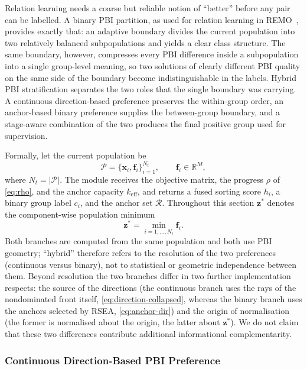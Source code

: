 \documentclass[11pt,a4paper]{article}
\newcommand{\vf}{\mathbf{f}}
\newcommand{\vx}{\mathbf{x}}
\newcommand{\vz}{\mathbf{z}}
\newcommand{\keff}{k_{\mathrm{eff}}}
\begin{document}
Relation learning needs a coarse but reliable notion of ``better'' before any
pair can be labelled. A binary PBI partition, as used for relation learning in
REMO~\cite{ref:remo}, provides exactly that: an adaptive boundary divides the
current population into two relatively balanced subpopulations and yields a
clear class structure. The same boundary, however, compresses every PBI
difference inside a subpopulation into a single group-level meaning, so two
solutions of clearly different PBI quality on the same side of the boundary
become indistinguishable in the labels. Hybrid PBI stratification separates the
two roles that the single boundary was carrying. A continuous
direction-based preference preserves the within-group order, an anchor-based
binary preference supplies the between-group boundary, and a stage-aware
combination of the two produces the final positive group used for supervision.

Formally, let the current population be
\begin{equation}
\mathcal{P}=\{\vx_i,\vf_i\}_{i=1}^{N_t},
\qquad
\vf_i\in\mathbb{R}^{M},
\label{eq:pop}
\end{equation}
where $N_t=|\mathcal{P}|$. The module receives the objective matrix, the
progress $\rho$ of \eqref{eq:rho}, and the anchor capacity $\keff$, and returns
a fused sorting score $h_i$, a binary group label $c_i$, and the anchor set
$\mathcal{R}$. Throughout this section $\vz^{*}$ denotes the component-wise
population minimum
\begin{equation}
\vz^{*}=\min_{i=1,\ldots,N_t}\vf_i .
\label{eq:ideal}
\end{equation}
Both branches are computed from the same population and both use PBI geometry;
``hybrid'' therefore refers to the resolution of the two preferences (continuous
versus binary), not to statistical or geometric independence between them. Beyond
resolution the two branches differ in two further implementation respects: the
source of the directions (the continuous branch uses the rays of the nondominated
front itself, \eqref{eq:direction-collapsed}, whereas the binary branch uses the
anchors selected by RSEA, \eqref{eq:anchor-dir}) and the origin of normalisation
(the former is normalised about the origin, the latter about $\vz^{*}$). We do not
claim that these two differences contribute additional informational
complementarity.

\subsubsection{Continuous Direction-Based PBI Preference}
\label{sec:method:hpc:cont}
\end{document}
